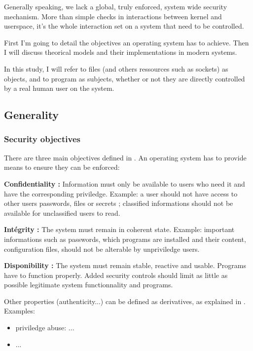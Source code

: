 \documentclass[pdftex,a4paper,titlepage,11pt]{article}
\begin{document}
\bigskip

Generally speaking, we lack a global, truly enforced, system wide security mechanism. More than simple checks in interactions between kernel and userspace, it's the whole interaction set on a system that need to be controlled.

\bigskip

First I'm going to detail the objectives an operating system has to achieve. Then I will discuss theorical models and their implementations in modern systems.

\bigskip

In this study, I will refer to files (and others ressources such as sockets) as objects, and to program as subjects, whether or not they are directly controlled by a real human user on the system.

\subsection{Generality}

\subsubsection{Security objectives}

There are three main objectives defined in \cite{SECOBJ}. An operating  system has to provide means to ensure they can be enforced:

\bigskip

\textbf{Confidentiality :}
Information must only be available to users who need it and have the corresponding priviledge. Example: a user should not have access to other users passwords, files or secrets ; classified informations should not be available for unclassified users to read.

\medskip

\textbf{Intégrity :}
The system must remain in coherent state. Example: important informations such as passwords, which programs are installed and their content, configuration files, should not be alterable by unpriviledge users.

\medskip

\textbf{Disponibility :}
The system must remain stable, reactive and usable. Programs have to function properly. Added security controls should limit as little as possible legitimate system functionnality and programs.

\bigskip

Other properties (authenticity...) can be defined as derivatives, as explained in \cite{THESEBRIFFAUT}. Examples:
\begin{itemize}
	\item priviledge abuse: ...
	\item ... %
\end{itemize}
\end{document}
